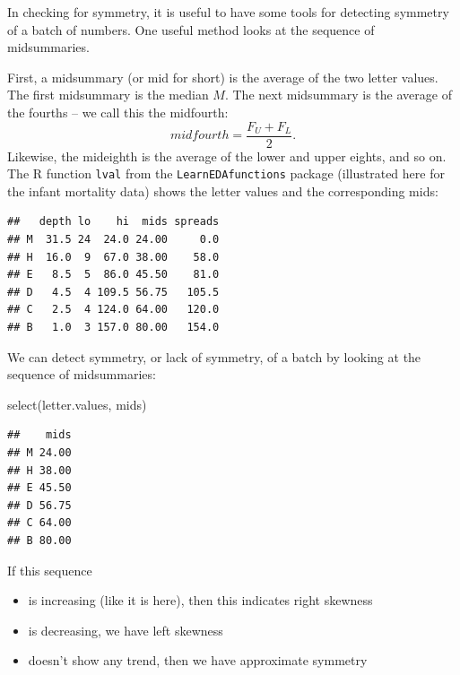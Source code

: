 \documentclass[
]{book}
\newenvironment{Shaded}{\begin{snugshade}}{\end{snugshade}}
\newcommand{\FunctionTok}[1]{\textcolor[rgb]{0.00,0.00,0.00}{#1}}
\newcommand{\NormalTok}[1]{#1}
\newcommand{\OtherTok}[1]{\textcolor[rgb]{0.56,0.35,0.01}{#1}}
\newcommand{\SpecialCharTok}[1]{\textcolor[rgb]{0.00,0.00,0.00}{#1}}
\providecommand{\tightlist}{%
  \setlength{\itemsep}{0pt}\setlength{\parskip}{0pt}}
\begin{document}
In checking for symmetry, it is useful to have some tools for detecting symmetry of a batch of numbers. One useful method looks at the sequence of midsummaries.

First, a midsummary (or mid for short) is the average of the two letter values. The first midsummary is the median \(M\). The next midsummary is the average of the fourths -- we call this the midfourth:
\[
midfourth = \frac{F_U + F_L}{2}.
\]
Likewise, the mideighth is the average of the lower and upper eights, and so on. The R function \texttt{lval} from the \texttt{LearnEDAfunctions} package (illustrated here for the infant mortality data) shows the letter values and the corresponding mids:

\begin{Shaded}
\end{Shaded}

\begin{verbatim}
##   depth lo    hi  mids spreads
## M  31.5 24  24.0 24.00     0.0
## H  16.0  9  67.0 38.00    58.0
## E   8.5  5  86.0 45.50    81.0
## D   4.5  4 109.5 56.75   105.5
## C   2.5  4 124.0 64.00   120.0
## B   1.0  3 157.0 80.00   154.0
\end{verbatim}

We can detect symmetry, or lack of symmetry, of a batch by looking at the sequence of midsummaries:

\begin{Shaded}
\begin{Highlighting}[]
\FunctionTok{select}\NormalTok{(letter.values, mids)}
\end{Highlighting}
\end{Shaded}

\begin{verbatim}
##    mids
## M 24.00
## H 38.00
## E 45.50
## D 56.75
## C 64.00
## B 80.00
\end{verbatim}

If this sequence

\begin{itemize}
\tightlist
\item
  is increasing (like it is here), then this indicates right skewness
\item
  is decreasing, we have left skewness
\item
  doesn't show any trend, then we have approximate symmetry
\end{itemize}
\end{document}
